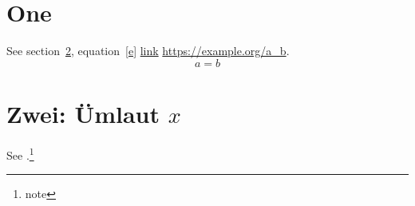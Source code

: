 \documentclass{article}
\begin{document}
\tableofcontents
\section{One}\label{s1} See section~\ref{s2}, equation~\eqref{e} \href{https://example.org}{link} \url{https://example.org/a_b}.
\begin{equation}\label{e} a=b\end{equation}
\section{Zwei: Ümlaut \texorpdfstring{$x$}{x}}\label{s2} See \pageref{s1}.\footnote{note}
\end{document}
